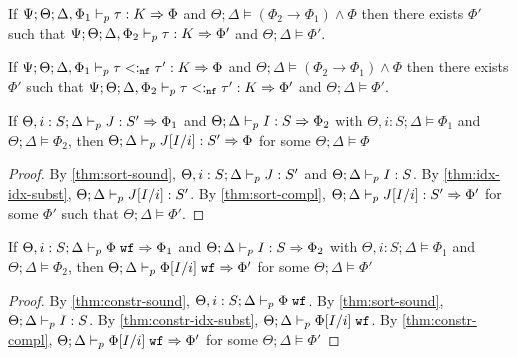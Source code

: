 \begin{theorem}
If $\Psi ; \Theta ; \Delta, \Phi_1 \vdash_p \tau : K \Rightarrow \Phi$ and $\Theta ; \Delta \vDash (\Phi_2 \to \Phi_1) \wedge \Phi$ then there exists $\Phi'$ such that
$\Psi ; \Theta ; \Delta, \Phi_2 \vdash_p \tau : K \Rightarrow \Phi'$ and $\Theta ; \Delta \vDash \Phi'$.
\label{thm:kind-assump-precomp}
\end{theorem}

\begin{theorem}
If $\Psi ; \Theta ; \Delta, \Phi_1 \vdash_p \tau <:_{\texttt{nf}} \tau' : K \Rightarrow \Phi$ and $\Theta ; \Delta \vDash (\Phi_2 \to \Phi_1) \wedge \Phi$ then there exists $\Phi'$ such that
$\Psi ; \Theta ; \Delta, \Phi_2 \vdash_p \tau <:_{\texttt{nf}} \tau' : K \Rightarrow \Phi'$ and $\Theta ; \Delta \vDash \Phi'$.
\label{thm:subty-assump-precomp}
\end{theorem}


\subtynerefl*

\subtynfrefl*

\subtynftrans*


\begin{theorem}
If $\Theta, i : S ; \Delta \vdash_p J : S' \Rightarrow \Phi_1$ and $\Theta ; \Delta \vdash_p I : S \Rightarrow \Phi_2$ with
$\Theta, i : S ; \Delta \vDash \Phi_1$ and $\Theta; \Delta \vDash \Phi_2$, then
$\Theta ; \Delta \vdash_p J[I/i] : S' \Rightarrow \Phi$ for some $\Theta ; \Delta \vDash \Phi$
\label{idx-idx-algo-subst}
\end{theorem}
\begin{proof}
By \autoref{thm:sort-sound}, $\Theta, i :S ; \Delta \vdash_p J : S'$ and $\Theta ; \Delta \vdash_p I : S$.
By \autoref{thm:idx-idx-subst}, $\Theta ; \Delta \vdash_p J[I/i] : S'$.
By \autoref{thm:sort-compl}, $\Theta ; \Delta \vdash_p J[I/i] : S' \Rightarrow \Phi'$ for some $\Phi'$ such that $\Theta ; \Delta \vDash \Phi'$.
\end{proof}

\begin{theorem}
If $\Theta, i : S; \Delta \vdash_p \Phi \; \texttt{wf} \Rightarrow \Phi_1$ and $\Theta ; \Delta \vdash_p I : S \Rightarrow \Phi_2$
with $\Theta, i : S ; \Delta \vDash \Phi_1$ and $\Theta ; \Delta \vDash \Phi_2$, then
$\Theta ; \Delta \vdash_p  \Phi[I/i] \; \texttt{wf} \Rightarrow \Phi'$ for some $\Theta ; \Delta \vDash \Phi'$
\label{thm:constr-idx-algo-subst}
\end{theorem}
\begin{proof}
By \autoref{thm:constr-sound}, $\Theta, i : S ; \Delta \vdash_p \Phi \; \texttt{wf}$.
By \autoref{thm:sort-sound}, $\Theta ; \Delta \vdash_p I : S$.
By \autoref{thm:constr-idx-subst}, $\Theta ; \Delta \vdash_p \Phi[I/i] \; \texttt{wf}$.
By \autoref{thm:constr-compl}, $\Theta ; \Delta \vdash_p \Phi[I/i] \; \texttt{wf} \Rightarrow \Phi'$ for some $\Theta ; \Delta \vDash \Phi'$
\end{proof}

